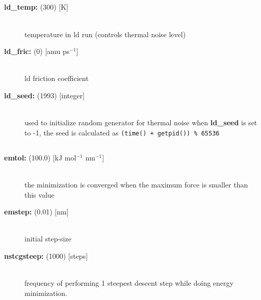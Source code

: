 \subsection{}
\begin{description}
\item[{\bf ld\_temp: }(300) {[K]}]\mbox{}\\
temperature in ld run (controls thermal noise level)
\item[{\bf ld\_fric: }(0) {[amu ps$^{-1}$]}]\mbox{}\\
ld friction coefficient
\item[{\bf ld\_seed: }(1993) {[integer]}]\mbox{}\\
used to initialize random generator for thermal noise
when {\bf ld\_seed} is set to -1, the seed is calculated as
{\tt (time() + getpid()) \% 65536}
\end{description}

\subsection{}
\begin{description}
\item[{\bf emtol: }(100.0) {[kJ mol$^{-1}$ nm$^{-1}$]}]\mbox{}\\
the minimization is converged when the maximum force is smaller than 
this value
\item[{\bf emstep: }(0.01) {[nm]}]\mbox{}\\
initial step-size
\item[{\bf nstcgsteep: }(1000) {[steps]}]\mbox{}\\
frequency of performing 1 steepest descent step while doing
 energy minimization.
\end{description}

